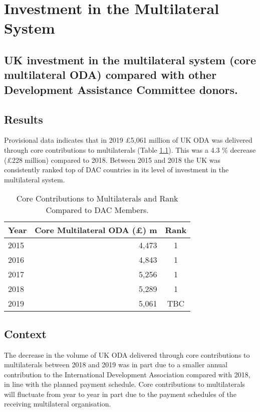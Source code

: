 \chapter{Investment in the Multilateral System}



\section*{UK investment in the multilateral system (core multilateral ODA) compared with other Development Assistance Committee donors.}

\bigskip
\bigskip

\thispagestyle{empty}


\section{Results}

Provisional data indicates that in 2019 \pounds 5,061 million of UK ODA was delivered through core contributions to multilaterals (Table \ref{tab:multi_rank}). %
This was a 4.3 \% decrease (\pounds 228 million) compared to 2018. %
Between 2015 and 2018 the UK was consistently ranked top of DAC countries in its level of investment in the multilateral system. %


\begin{table}[htbp]
  \centering
  \caption{Core Contributions to Multilaterals and Rank Compared to DAC Members.}\label{tab:multi_rank}
  \begin{tabular}{lrc}
  \toprule
  \multicolumn{1}{c}{\textbf{Year}} & \multicolumn{1}{c}{\textbf{Core Multilateral ODA (\pounds) m}} & \multicolumn{1}{c}{\textbf{Rank}} \\ \hline
  \rule{0pt}{10pt}2015 & 4,473 & 1 \\
  2016 & 4,843 & 1 \\
  2017 & 5,256 & 1 \\
  2018 & 5,289 & 1 \\
  2019 & 5,061 & TBC\footnotemark \\
  \bottomrule
  \end{tabular}
\end{table}




\section{Context}
The decrease in the volume of UK ODA delivered through core contributions to multilaterals between 2018 and 2019 was in part due to a smaller annual contribution to the International Development Association compared with 2018, in line with the planned payment schedule. %
Core contributions to multilaterals will fluctuate from year to year in part due to the payment schedules of the receiving multilateral organisation. %


\newpage
